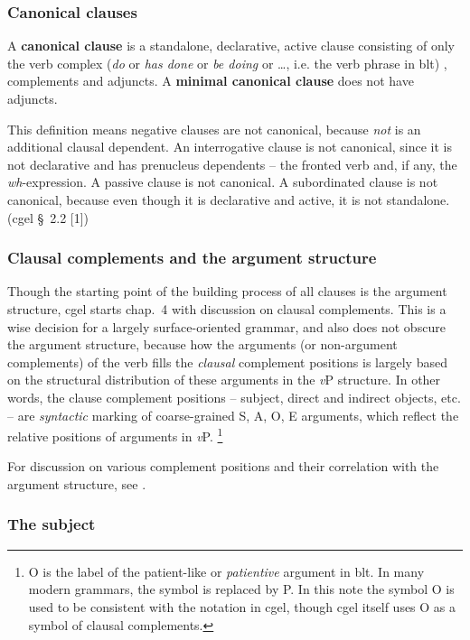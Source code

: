\documentclass{article}
\newcommand*{\citesec}[1]{\S~{#1}}
\newcommand*{\citechap}[1]{chap.~{#1}}
\newcommand*{\concept}[1]{\textbf{#1}}
\newcommand*{\term}[1]{\emph{#1}}
\newcommand*{\corpus}[1]{\emph{#1}}
\newcommand*{\vP}{\textit{v}P}
\begin{document}
\subsubsection{Canonical clauses}

A \concept{canonical clause} is a standalone, declarative, active clause 
consisting of only the verb complex 
(\emph{do} or \emph{has done} or \emph{be doing} or \dots, i.e. the verb phrase in \ac{blt})
, complements and adjuncts. 
A \concept{minimal canonical clause} does not have adjuncts.

This definition means negative clauses are not canonical,
because \corpus{not} is an additional clausal dependent.
An interrogative clause is not canonical,
since it is not declarative and has prenucleus dependents 
-- the fronted verb and, if any, the \term{wh}-expression.
A passive clause is not canonical.
A subordinated clause is not canonical, 
because even though it is declarative and active,
it is not standalone.
(\ac{cgel} \citesec{2.2} [1])


\subsubsection{Clausal complements and the argument structure}

Though the starting point of the building process of all clauses is the argument structure,
\ac{cgel} starts \citechap{4} with discussion on clausal complements.
This is a wise decision for a largely surface-oriented grammar,
and also does not obscure the argument structure, 
because how the arguments (or non-argument complements) of the verb 
fills the \emph{clausal} complement positions
is largely based on the structural distribution of these arguments in the \vP{} structure.
In other words, the clause complement positions -- subject, direct and indirect objects, etc. --
are \emph{syntactic} marking of coarse-grained S, A, O, E arguments,
which reflect the relative positions of arguments in \vP.%
\footnote{
    O is the label of the patient-like or \term{patientive} argument in \ac{blt}.
    In many modern grammars, the symbol is replaced by P.
    In this note the symbol O is used to be consistent with the notation in \ac{cgel}, 
    though \ac{cgel} itself uses O as a symbol of clausal complements.
}

For discussion on various complement positions and their correlation with the argument structure,
see .

\subsubsection{The subject}
\end{document}
